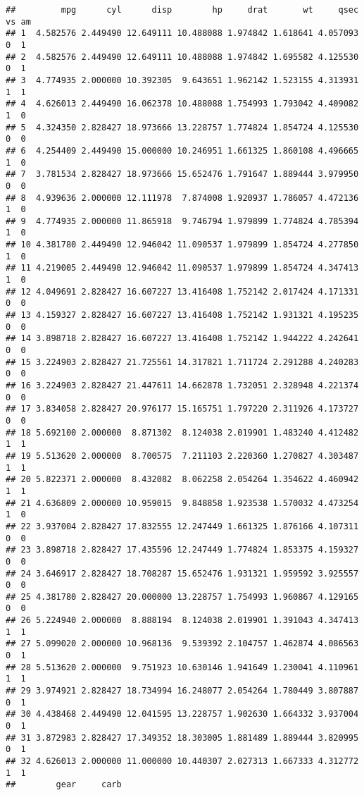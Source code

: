 \documentclass[
]{article}
\begin{document}
\begin{verbatim}
##         mpg      cyl      disp        hp     drat       wt     qsec vs am
## 1  4.582576 2.449490 12.649111 10.488088 1.974842 1.618641 4.057093  0  1
## 2  4.582576 2.449490 12.649111 10.488088 1.974842 1.695582 4.125530  0  1
## 3  4.774935 2.000000 10.392305  9.643651 1.962142 1.523155 4.313931  1  1
## 4  4.626013 2.449490 16.062378 10.488088 1.754993 1.793042 4.409082  1  0
## 5  4.324350 2.828427 18.973666 13.228757 1.774824 1.854724 4.125530  0  0
## 6  4.254409 2.449490 15.000000 10.246951 1.661325 1.860108 4.496665  1  0
## 7  3.781534 2.828427 18.973666 15.652476 1.791647 1.889444 3.979950  0  0
## 8  4.939636 2.000000 12.111978  7.874008 1.920937 1.786057 4.472136  1  0
## 9  4.774935 2.000000 11.865918  9.746794 1.979899 1.774824 4.785394  1  0
## 10 4.381780 2.449490 12.946042 11.090537 1.979899 1.854724 4.277850  1  0
## 11 4.219005 2.449490 12.946042 11.090537 1.979899 1.854724 4.347413  1  0
## 12 4.049691 2.828427 16.607227 13.416408 1.752142 2.017424 4.171331  0  0
## 13 4.159327 2.828427 16.607227 13.416408 1.752142 1.931321 4.195235  0  0
## 14 3.898718 2.828427 16.607227 13.416408 1.752142 1.944222 4.242641  0  0
## 15 3.224903 2.828427 21.725561 14.317821 1.711724 2.291288 4.240283  0  0
## 16 3.224903 2.828427 21.447611 14.662878 1.732051 2.328948 4.221374  0  0
## 17 3.834058 2.828427 20.976177 15.165751 1.797220 2.311926 4.173727  0  0
## 18 5.692100 2.000000  8.871302  8.124038 2.019901 1.483240 4.412482  1  1
## 19 5.513620 2.000000  8.700575  7.211103 2.220360 1.270827 4.303487  1  1
## 20 5.822371 2.000000  8.432082  8.062258 2.054264 1.354622 4.460942  1  1
## 21 4.636809 2.000000 10.959015  9.848858 1.923538 1.570032 4.473254  1  0
## 22 3.937004 2.828427 17.832555 12.247449 1.661325 1.876166 4.107311  0  0
## 23 3.898718 2.828427 17.435596 12.247449 1.774824 1.853375 4.159327  0  0
## 24 3.646917 2.828427 18.708287 15.652476 1.931321 1.959592 3.925557  0  0
## 25 4.381780 2.828427 20.000000 13.228757 1.754993 1.960867 4.129165  0  0
## 26 5.224940 2.000000  8.888194  8.124038 2.019901 1.391043 4.347413  1  1
## 27 5.099020 2.000000 10.968136  9.539392 2.104757 1.462874 4.086563  0  1
## 28 5.513620 2.000000  9.751923 10.630146 1.941649 1.230041 4.110961  1  1
## 29 3.974921 2.828427 18.734994 16.248077 2.054264 1.780449 3.807887  0  1
## 30 4.438468 2.449490 12.041595 13.228757 1.902630 1.664332 3.937004  0  1
## 31 3.872983 2.828427 17.349352 18.303005 1.881489 1.889444 3.820995  0  1
## 32 4.626013 2.000000 11.000000 10.440307 2.027313 1.667333 4.312772  1  1
##        gear     carb

\end{verbatim}
\end{document}
